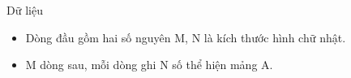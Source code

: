 Dữ liệu
\begin{itemize}
	\item     Dòng đầu gồm hai số nguyên M, N là kích thước hình chữ nhật.   
	\item     M dòng sau, mỗi dòng ghi N số thể hiện mảng A.   
\end{itemize}